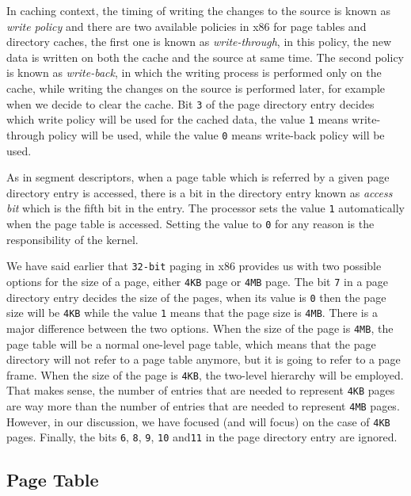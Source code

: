 In caching context, the timing of writing the changes to the source is
known as \emph{write policy} and there are two available policies in x86
for page tables and directory caches, the first one is known as
\emph{write-through}, in this policy, the new data is written on both
the cache and the source at same time. The second policy is known as
\emph{write-back}, in which the writing process is performed only on the
cache, while writing the changes on the source is performed later, for
example when we decide to clear the cache. Bit \lstinline!3! of the page
directory entry decides which write policy will be used for the cached
data, the value \lstinline!1! means write-through policy will be used,
while the value \lstinline!0! means write-back policy will be used.

As in segment descriptors, when a page table which is referred by a
given page directory entry is accessed, there is a bit in the directory
entry known as \emph{access bit} which is the fifth bit in the entry.
The processor sets the value \lstinline!1! automatically when the page
table is accessed. Setting the value to \lstinline!0! for any reason is
the responsibility of the kernel.

We have said earlier that \lstinline!32-bit! paging in x86 provides us
with two possible options for the size of a page, either \lstinline!4KB!
page or \lstinline!4MB! page. The bit \lstinline!7! in a page directory
entry decides the size of the pages, when its value is \lstinline!0!
then the page size will be \lstinline!4KB! while the value \lstinline!1!
means that the page size is \lstinline!4MB!. There is a major difference
between the two options. When the size of the page is \lstinline!4MB!,
the page table will be a normal one-level page table, which means that
the page directory will not refer to a page table anymore, but it is
going to refer to a page frame. When the size of the page is
\lstinline!4KB!, the two-level hierarchy will be employed. That makes
sense, the number of entries that are needed to represent
\lstinline!4KB! pages are way more than the number of entries that are
needed to represent \lstinline!4MB! pages. However, in our discussion,
we have focused (and will focus) on the case of \lstinline!4KB! pages.
Finally, the bits \lstinline!6!, \lstinline!8!, \lstinline!9!,
\lstinline!10! and\lstinline!11! in the page directory entry are
ignored.

\subsection{Page Table}\label{page-table}


